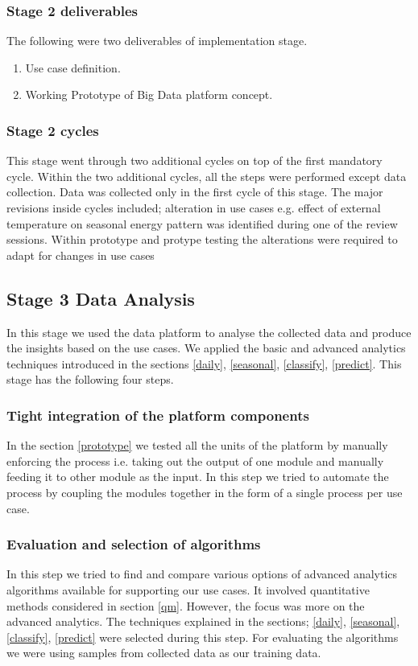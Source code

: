 \subsubsection{Stage 2 deliverables}
The following were two deliverables of implementation stage.
\begin{enumerate}
\item Use case definition.
\item Working Prototype of Big Data platform concept.
\end{enumerate}
\subsubsection{Stage 2 cycles}
This stage went through two additional cycles on top of the first mandatory cycle. Within the two additional cycles, all the steps were performed except data collection. Data was collected only in the first cycle of this stage. 
The major revisions inside cycles included; alteration in use cases e.g. effect of external temperature on seasonal energy pattern was identified during one of the review sessions. Within prototype and protype testing the alterations were required to adapt for changes in use cases

\subsection{Stage 3 Data Analysis}
In this stage we used the data platform to analyse the collected data and produce the insights based on the use cases. We applied the basic and advanced analytics techniques introduced in the sections  \ref{daily}, \ref{seasonal}, \ref{classify}, \ref{predict}. This stage has the following four steps.
\subsubsection{Tight integration of the platform components}
In the section \ref{prototype} we tested all the units of the platform by manually enforcing the process i.e. taking out the  output of one module and manually feeding it to other module as the input. In this step we tried to automate the process by coupling the modules together in the form of a single process per use case. 
\subsubsection{Evaluation and selection of algorithms}\label{eval}
In this step we tried to find and compare various options of advanced analytics algorithms available for supporting our use cases. It involved quantitative methods considered in section \ref{qm}. However, the focus was more on the advanced analytics. The techniques explained in the sections; \ref{daily}, \ref{seasonal},  \ref{classify}, \ref{predict} were selected during this step. For evaluating the algorithms we were using samples from collected data as our training data. 
